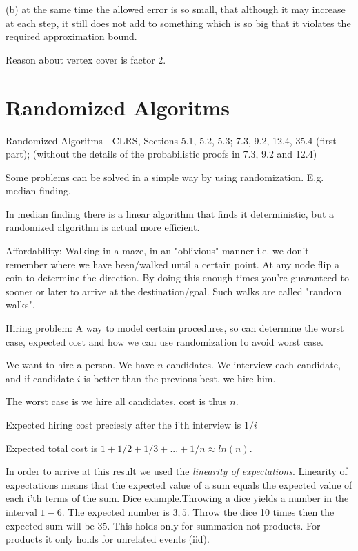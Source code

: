 \documentclass[10pt]{article}
\begin{document}
(b) at the same time the allowed error is so small, that although it may increase at each step, it still does not add to something which is so big that it violates the required approximation bound.

Reason about vertex cover is factor 2.


\section{Randomized Algoritms} %
\label{sec:randomized_algoritms}
Randomized Algoritms - CLRS, Sections  5.1, 5.2, 5.3; 7.3, 9.2, 12.4, 35.4 (first part); (without the details of the probabilistic proofs in 7.3, 9.2 and 12.4)                                                                                                                                                    

Some problems can be solved in a simple way by using randomization. E.g. median finding. 

In median finding there is a linear algorithm that finds it deterministic, but a randomized algorithm is actual more efficient.

Affordability: Walking in a maze, in an "oblivious" manner i.e. we don't remember where we have been/walked until a certain point. At any node flip a coin to determine the direction. By doing this enough times you're guaranteed to sooner or later to arrive at the destination/goal. Such walks are called "random walks". 


Hiring problem: A way to model certain procedures, so can determine the worst case, expected cost and how we can use randomization to avoid worst case.


We want to hire a person. We have $n$ candidates. We interview each candidate, and if candidate $i$ is better than the previous best, we hire him.

The worst case is we hire all candidates, cost is thus $n$.

Expected hiring cost preciesly after the i'th interview is $1/i$

Expected total cost is $1+1/2+1/3+...+1/n \approx ln(n)$.

In order to arrive at this result we used the \emph{linearity of expectations}. Linearity of expectations means that the expected value of a sum equals the expected value of each i'th terms of the sum. Dice example.Throwing a dice yields a number in the interval $1-6$. The expected number is $3,5$. Throw the dice 10 times then the expected sum will be 35. This holds only for summation not products. For products it only holds for unrelated events (iid).
\end{document}
